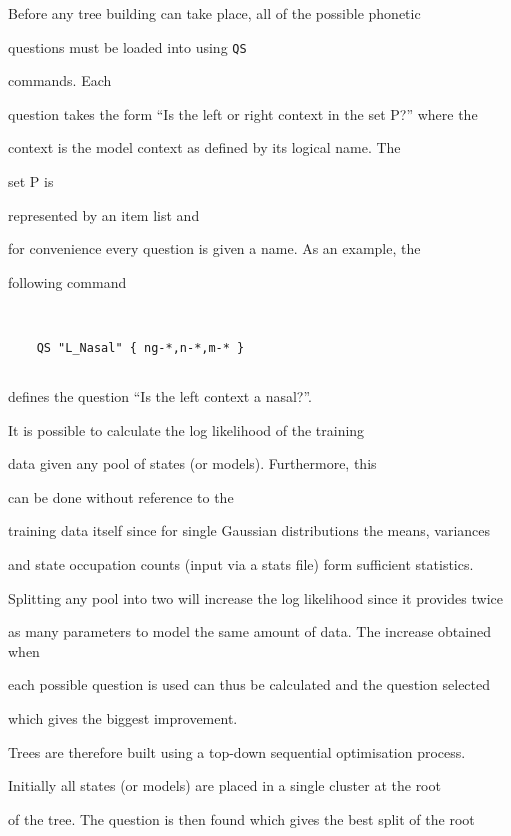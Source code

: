 Before any tree building can take place, all of the possible phonetic


questions must be loaded into  using \texttt{QS} 


commands.  Each


question takes the form ``Is the left or right context in the set P?'' where the


context is the model context as defined by its logical name.  The 


set P is


represented by an item list and


for convenience every question is given a name.  As an example, the


following command 


\begin{verbatim}


    QS "L_Nasal" { ng-*,n-*,m-* }


\end{verbatim}


defines the question ``Is the left context a nasal?''.





It is possible to calculate the log likelihood of the training


data given any pool of states (or models).  Furthermore, this 


can be done without reference to the


training data itself since for single Gaussian distributions the means, variances


and state occupation counts (input via a stats file) form sufficient statistics.


Splitting any pool into two will increase the log likelihood since it provides twice


as many parameters to model the same amount of data.  The increase obtained when


each possible question is used can thus be calculated and the question selected


which gives the biggest improvement.  





Trees are therefore built using a top-down sequential optimisation process.


Initially all states (or models) are placed in a single cluster at the root


of the tree.  The question is then found which gives the best split of the root


